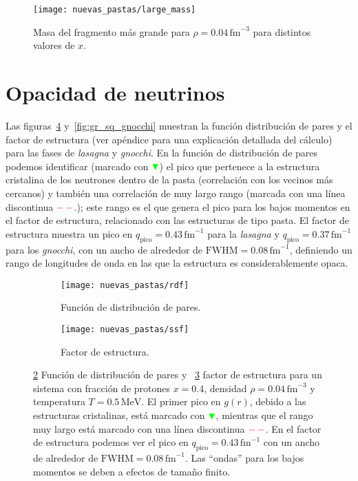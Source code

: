 \begin{figure}
  \centering
  \texttt{[image: nuevas\_pastas/large\_mass]}
  \caption{Masa del fragmento más grande para $\rho = 0.04\,\text{fm}^{-3}$ para distintos valores de $x$.}
  \label{fig:large_mass}
\end{figure}

\section{Opacidad de neutrinos}\label{sc:opacity}

Las figuras~\ref{fig:gr_sq} y~\ref{fig:gr_sq_gnocchi} muestran la función distribución de pares y el factor de estructura (ver apéndice para una explicación detallada del cálculo) para las fases de \emph{lasagna} y \emph{gnocchi}.
En la función de distribución de pares podemos identificar (marcado con $\color{green} \blacktriangledown$) el pico que pertenece a la estructura cristalina de los neutrones dentro de la pasta (correlación con los vecinos más cercanos) y también una correlación de muy largo rango (marcada con una línea discontinua $\color{red}-\,-$.);
este rango es el que genera el pico para los bajos momentos en el factor de estructura, relacionado con las estructuras de tipo pasta.
El factor de estructura muestra un pico en $q_\text{pico} = 0.43\,\text{fm}^{-1}$ para la \emph{lasagna} y $q_\text{pico} = 0.37\,\text{fm}^{-1}$ para los \emph{gnocchi}, con un ancho de alrededor de
$\text{FWHM} = 0.08\,\text{fm}^{-1}$, definiendo un rango de longitudes de onda en las que la estructura es considerablemente opaca.

\begin{figure}  \centering
  \begin{subfigure}[h!]{0.45\columnwidth}
    \centering
    \texttt{[image: nuevas\_pastas/rdf]}
    \caption{Función de distribución de pares.}
      \label{sfig:gr}
  \end{subfigure}
  \begin{subfigure}[h!]{0.45\columnwidth}
    \centering
    \texttt{[image: nuevas\_pastas/ssf]}
    \caption{Factor de estructura.}
      \label{sfig:ssf}
  \end{subfigure}
  \caption{\ref{sfig:gr} Función de distribución de pares y ~\ref{sfig:ssf} factor de estructura para un sistema con fracción de protones $x=0.4$, densidad $\rho=0.04\,\text{fm}^{-3}$ y temperatura $T=0.5\,\text{MeV}$.
    El primer pico en $g(r)$, debido a las estructuras cristalinas, está marcado con $\color{green} \blacktriangledown$, mientras que el rango muy largo está marcado con una línea discontinua $\color{red}-\,-$.
    En el factor de estructura podemos ver el pico en $q_\text{pico} = 0.43\,\text{fm}^{-1}$ con un ancho de alrededor de $\text{FWHM} = 0.08\,\text{fm}^{-1}$.
    Las ``ondas'' para los bajos momentos se deben a efectos de tamaño finito.}
  \label{fig:gr_sq}
\end{figure}

